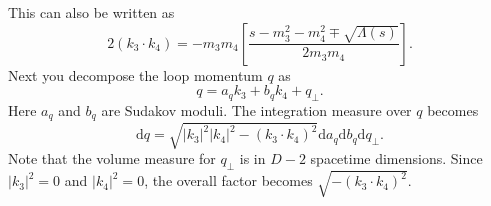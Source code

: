 This can also be written as
\begin{equation}
	2 (k_{3} \cdot k_{4}) = -m_{3} m_{4} \left[ \frac{s - m_{3}^{2} - m_{4}^{2} \mp \sqrt{\Lambda(s)}}{2 m_{3} m_{4}} \right].
\end{equation}
Next you decompose the loop momentum $q$ as
\begin{equation}
	q = a_{q} k_{3} + b_{q} k_{4} + q_{\perp}.
\end{equation}
Here $a_{q}$ and $b_{q}$ are Sudakov moduli. The integration measure over $q$ becomes
\begin{equation}
	\mathrm{d}q = \sqrt{|k_{3}|^{2} |k_{4}|^{2} - (k_{3} \cdot k_{4})^{2}} \mathrm{d}a_{q} \mathrm{d}b_{q} \mathrm{d}q_{\perp}.
\end{equation}
Note that the volume measure for $q_{\perp}$ is in $D-2$ spacetime dimensions. Since $|k_{3}|^{2} = 0$ and $|k_{4}|^{2} = 0$, the overall factor becomes $\sqrt{-(k_{3} \cdot k_{4})^{2}}$.

